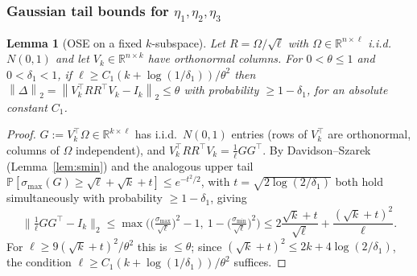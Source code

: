 \documentclass{amsart}
\newtheorem{lemma}{Lemma}
\theoremstyle{definition}
\newcommand{\R}{\mathbb{R}}
\newcommand{\Op}[1]{\left\lVert #1\right\rVert_2}
\newcommand{\Prob}{\mathbb{P}}
\begin{document}
\subsubsection*{Gaussian tail bounds for $\eta_1,\eta_2,\eta_3$}

\begin{lemma}[OSE on a fixed $k$-subspace]\label{lem:ose}
Let $R=\Omega/\sqrt\ell$ with $\Omega\in\R^{n\times\ell}$ i.i.d.\ $N(0,1)$ and let
$V_k\in\R^{n\times k}$ have orthonormal columns. For $0<\theta\le1$ and
$0<\delta_1<1$, if $\ell\ge C_1(k+\log(1/\delta_1))/\theta^2$ then
$\Op{\Delta}=\Op{V_k^\top RR^\top V_k-I_k}\le\theta$ with probability
$\ge1-\delta_1$, for an absolute constant $C_1$.
\end{lemma}
\begin{proof}
$G:=V_k^\top\Omega\in\R^{k\times\ell}$ has i.i.d.\ $N(0,1)$ entries (rows of
$V_k^\top$ are orthonormal, columns of $\Omega$ independent), and
$V_k^\top RR^\top V_k=\frac1\ell GG^\top$. By Davidson--Szarek
(Lemma~\ref{lem:smin}) and the analogous upper tail
$\Prob[\sigma_{\max}(G)\ge\sqrt\ell+\sqrt k+t]\le e^{-t^2/2}$, with
$t=\sqrt{2\log(2/\delta_1)}$ both hold simultaneously with probability
$\ge1-\delta_1$, giving
\[
\Big\|\tfrac1\ell GG^\top-I_k\Big\|_2
\le\max\Big(\big(\tfrac{\sigma_{\max}}{\sqrt\ell}\big)^2-1,\ 1-\big(\tfrac{\sigma_{\min}}{\sqrt\ell}\big)^2\Big)
\le 2\frac{\sqrt k+t}{\sqrt\ell}+\frac{(\sqrt k+t)^2}{\ell}.
\]
For $\ell\ge9(\sqrt k+t)^2/\theta^2$ this is $\le\theta$; since
$(\sqrt k+t)^2\le2k+4\log(2/\delta_1)$, the condition
$\ell\ge C_1(k+\log(1/\delta_1))/\theta^2$ suffices.
\end{proof}
\end{document}
